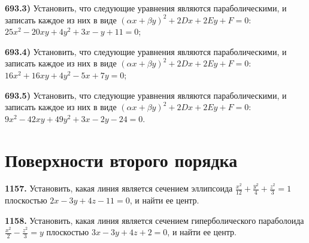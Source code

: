 \textbf{693.3)} Установить, что следующие уравнения являются параболическими, и записать каждое из них в виде $(\alpha x+\beta y)^2+2 D x+2 E y+F=0$: $25 x^2-20 x y+4 y^2+3 x-y+11=0$;

\textbf{693.4)} Установить, что следующие уравнения являются параболическими, и записать каждое из них в виде $(\alpha x+\beta y)^2+2 D x+2 E y+F=0$: $16 x^2+16 x y+4 y^2-5 x+7 y=0$;

\textbf{693.5)} Установить, что следующие уравнения являются параболическими, и записать каждое из них в виде $(\alpha x+\beta y)^2+2 D x+2 E y+F=0$: $9 x^2-42 x y+49 y^2+3 x-2 y-24=0$.



\section{Поверхности второго порядка}



\textbf{1157.} Установить, какая линия является сечением эллипсоида $\frac{x^2}{12}+\frac{y^2}{4}+\frac{z^2}{3}=1$ плоскостью $2 x-3 y+4 z-11=0$, и найти ее центр.

\textbf{1158.} Установить, какая линия является сечением гиперболического параболоида $\frac{x^2}{2}-\frac{z^2}{3}=y$ плоскостью $3 x-3 y+4 z+2=0$, и найти ее центр.